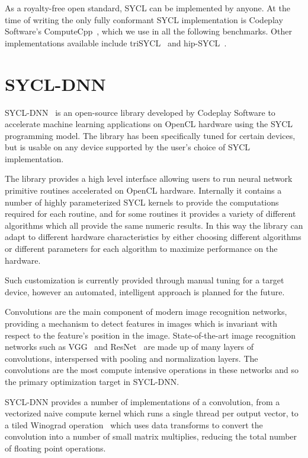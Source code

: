 \documentclass[sigconf]{acmart}
\begin{document}
As a royalty-free open standard, SYCL can be implemented by anyone. At the time of
writing the only fully conformant SYCL implementation is Codeplay Software's
ComputeCpp~\cite{computecpp}, which we use in all the following benchmarks.
Other implementations available include triSYCL~\cite{trisycl} and
hip-SYCL~\cite{hipsycl}.

\section{SYCL-DNN}

SYCL-DNN~\cite{sycldnn} is an open-source library developed by Codeplay Software
to accelerate machine learning applications on OpenCL hardware using the SYCL
programming model. The library has been specifically tuned for certain devices,
but is usable on any device supported by the user's choice of SYCL
implementation.

The library provides a high level interface allowing users to run neural network
primitive routines accelerated on OpenCL hardware. Internally it contains a
number of highly parameterized SYCL kernels to provide the computations required
for each routine, and for some routines it provides a variety of different
algorithms which all provide the same numeric results. In this way the library
can adapt to different hardware characteristics by either choosing different
algorithms or different parameters for each algorithm to maximize performance on
the hardware.

Such customization is currently provided through manual tuning for a target
device, however an automated, intelligent approach is planned for the future.

Convolutions are the main component of modern image recognition networks,
providing a mechanism to detect features in images which is invariant with
respect to the feature's position in the image. State-of-the-art image
recognition networks such as VGG~\cite{vgg} and ResNet~\cite{resnet} are made up
of many layers of convolutions, interspersed with pooling and normalization
layers. The convolutions are the most compute intensive operations in these
networks and so the primary optimization target in SYCL-DNN\@.

SYCL-DNN provides a number of implementations of a convolution, from a
vectorized naive compute kernel which runs a single thread per output vector, to
a tiled Winograd operation~\cite{winograd} which uses data transforms to convert
the convolution into a number of small matrix multiplies, reducing
the total number of floating point operations.
\end{document}
